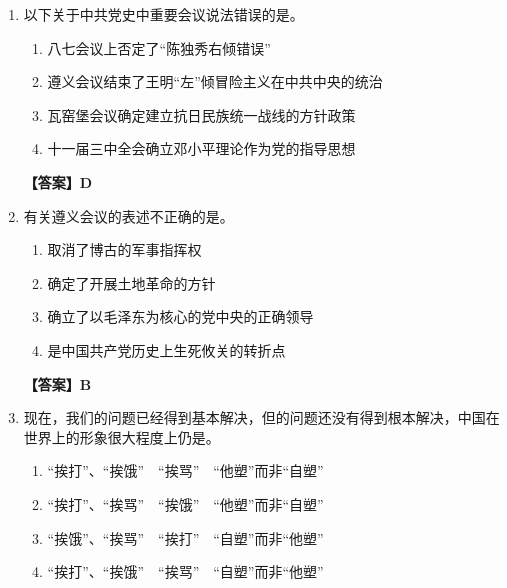 \documentclass[UTF8,11pt,a4paper]{ctexart}
\begin{document}
\begin{enumerate}[label=\textbf{\arabic*.}, leftmargin=2.5em, itemsep=0.7em]
\begin{enumerate}[label=\Alph*., leftmargin=2em, itemsep=0.1em, topsep=0.15em]
\item 立德；立德树人
\item 立德；立德育人
\item 文化教育；立德树人
\item 文化教育；立德育人
\end{enumerate}
\textbf{【答案】A}
\item 以下关于中共党史中重要会议说法错误的是\allowbreak\underline{\hspace{4em}}。
\begin{enumerate}[label=\Alph*., leftmargin=2em, itemsep=0.1em, topsep=0.15em]
\item 八七会议上否定了“陈独秀右倾错误”
\item 遵义会议结束了王明“左”倾冒险主义在中共中央的统治
\item 瓦窑堡会议确定建立抗日民族统一战线的方针政策
\item 十一届三中全会确立邓小平理论作为党的指导思想
\end{enumerate}
\textbf{【答案】D}
\item 有关遵义会议的表述不正确的是\allowbreak\underline{\hspace{4em}}。
\begin{enumerate}[label=\Alph*., leftmargin=2em, itemsep=0.1em, topsep=0.15em]
\item 取消了博古的军事指挥权
\item 确定了开展土地革命的方针
\item 确立了以毛泽东为核心的党中央的正确领导
\item 是中国共产党历史上生死攸关的转折点
\end{enumerate}
\textbf{【答案】B}
\item 现在，我们\allowbreak\underline{\hspace{4em}}的问题已经得到基本解决，但\allowbreak\underline{\hspace{4em}}的问题还没有得到根本解决，中国在世界上的形象很大程度上仍是\allowbreak\underline{\hspace{4em}}。
\begin{enumerate}[label=\Alph*., leftmargin=2em, itemsep=0.1em, topsep=0.15em]
\item “挨打”、“挨饿”　“挨骂”　“他塑”而非“自塑”
\item “挨打”、“挨骂”　“挨饿”　“他塑”而非“自塑”
\item “挨饿”、“挨骂”　“挨打”　“自塑”而非“他塑”
\item “挨打”、“挨饿”　“挨骂”　“自塑”而非“他塑”

\end{enumerate}
\end{enumerate}
\end{document}
